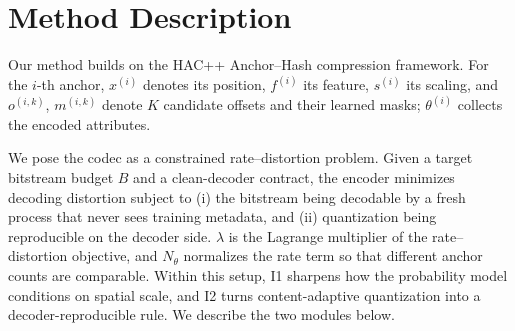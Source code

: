 \documentclass[conference]{IEEEtran}
\begin{document}
\section{Method Description}
Our method builds on the HAC++ Anchor--Hash compression framework. For
the $i$-th anchor, $x^{(i)}$ denotes its position, $f^{(i)}$ its
feature, $s^{(i)}$ its scaling, and $o^{(i,k)}$, $m^{(i,k)}$ denote
$K$ candidate offsets and their learned masks; $\theta^{(i)}$ collects
the encoded attributes.

We pose the codec as a constrained rate--distortion problem. Given a
target bitstream budget $B$ and a clean-decoder contract, the encoder
minimizes decoding distortion subject to (i) the bitstream being
decodable by a fresh process that never sees training metadata, and (ii)
quantization being reproducible on the decoder side. $\lambda$ is the
Lagrange multiplier of the rate--distortion objective, and $N_\theta$
normalizes the rate term so that different anchor counts are comparable.
Within this setup, I1 sharpens how the probability model conditions on
spatial scale, and I2 turns content-adaptive quantization into a
decoder-reproducible rule. We describe the two modules below.
\end{document}
